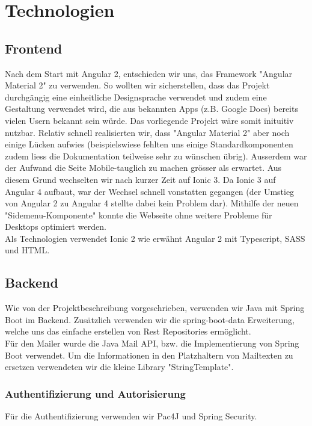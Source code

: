 \documentclass[11pt]{article} %
\begin{document}
\newpage
\section{Technologien}

\subsection{Frontend}
Nach dem Start mit Angular 2, entschieden wir uns, das Framework "Angular Material 2" zu verwenden. So wollten wir sicherstellen, dass das Projekt durchgängig eine einheitliche Designsprache verwendet und zudem eine Gestaltung verwendet wird, die aus bekannten Apps (z.B. Google Docs) bereits vielen Usern bekannt sein würde. Das vorliegende Projekt wäre somit inituitiv nutzbar. Relativ schnell realisierten wir, dass "Angular Material 2" aber noch einige Lücken aufwies (beispielswiese fehlten uns einige Standardkomponenten zudem liess die Dokumentation teilweise sehr zu wünschen übrig). Ausserdem war der Aufwand die Seite Mobile-tauglich zu machen grösser als erwartet. Aus diesem Grund wechselten wir nach kurzer Zeit auf Ionic 3. Da Ionic 3 auf Angular 4 aufbaut, war der Wechsel schnell vonstatten gegangen (der Umstieg von Angular 2 zu Angular 4 stellte dabei kein Problem dar). Mithilfe der neuen "Sidemenu-Komponente" konnte die Webseite ohne weitere Probleme für Desktops optimiert werden.
\\
Als Technologien verwendet Ionic 2 wie erwähnt Angular 2 mit Typescript, SASS und HTML.

\subsection{Backend}
Wie von der Projektbeschreibung vorgeschrieben, verwenden wir Java mit Spring Boot im Backend. Zusätzlich verwenden wir die spring-boot-data Erweiterung, welche uns das einfache erstellen von Rest Repositories ermöglicht.
\\
Für den Mailer wurde die Java Mail API, bzw. die Implementierung von Spring Boot verwendet. Um die Informationen in den Platzhaltern von Mailtexten zu ersetzen verwendeten wir die kleine Library "StringTemplate".

\subsubsection{Authentifizierung und Autorisierung}
Für die Authentifizierung verwenden wir Pac4J und Spring Security. 
\end{document}
